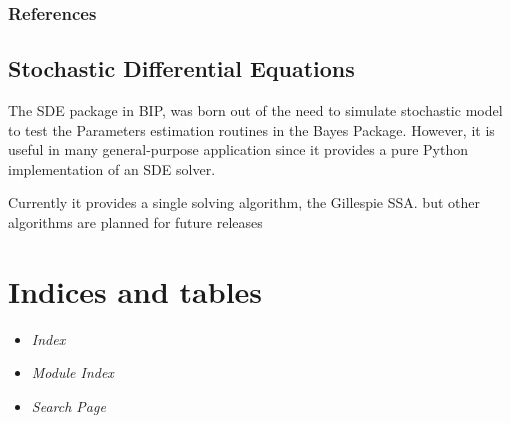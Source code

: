 \documentclass[a4paper,10pt,english]{manual}
\begin{document}
\subsection{References}

\resetcurrentobjects
\hypertarget{--doc-sde}{}

\hypertarget{sde}{}\section{Stochastic Differential Equations}

The SDE package in BIP, was born out of the need to simulate stochastic model to test the Parameters estimation routines in the Bayes Package. However, it is useful in many general-purpose application since it provides a pure Python implementation of an SDE solver.

Currently it provides a single solving algorithm, the Gillespie SSA. but other algorithms are planned for future releases


\chapter{Indices and tables}
\begin{itemize}
\item {} 
\emph{Index}

\item {} 
\emph{Module Index}

\item {} 
\emph{Search Page}

\end{itemize}


\renewcommand{\indexname}{Module Index}
\printmodindex
\renewcommand{\indexname}{Index}
\printindex
\end{document}
